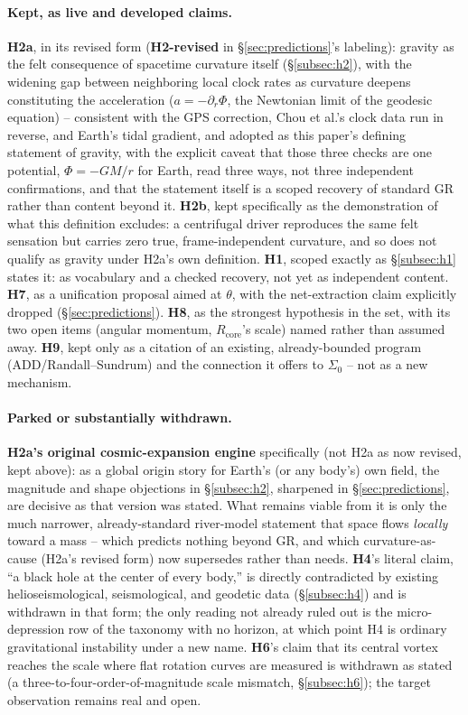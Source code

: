 \documentclass[12pt, a4paper]{article}
\begin{document}
\paragraph{Kept, as live and developed claims.}
\textbf{H2a}, in its revised form (\textbf{H2-revised} in
\S\ref{sec:predictions}'s labeling): gravity as the felt consequence
of spacetime curvature itself (\S\ref{subsec:h2}), with the widening
gap between neighboring local clock rates as curvature deepens
constituting the acceleration ($a=-\partial_r\Phi$, the Newtonian
limit of the geodesic equation) -- consistent with the GPS
correction, Chou et al.'s clock data run in reverse, and Earth's
tidal gradient, and adopted as this paper's defining statement of
gravity, with the explicit caveat that those three checks are one
potential, $\Phi=-GM/r$ for Earth, read three ways, not three
independent confirmations, and that the statement itself is a
scoped recovery of standard GR rather than content beyond it.
\textbf{H2b}, kept specifically as the
demonstration of what this definition excludes: a centrifugal driver
reproduces the same felt sensation but carries zero true,
frame-independent curvature, and so does not qualify as gravity under
H2a's own definition. \textbf{H1}, scoped exactly as \S\ref{subsec:h1}
states it: as vocabulary and a checked recovery, not yet as
independent content.
\textbf{H7}, as a unification proposal aimed at $\theta$, with the
net-extraction claim explicitly dropped
(\S\ref{sec:predictions}). \textbf{H8}, as the strongest hypothesis in
the set, with its two open items (angular momentum, $R_{\mathrm{core}}$'s
scale) named rather than assumed away. \textbf{H9}, kept only as a
citation of an existing, already-bounded program (ADD/Randall--Sundrum)
and the connection it offers to $\Sigma_0$ -- not as a new mechanism.

\paragraph{Parked or substantially withdrawn.}
\textbf{H2a's original cosmic-expansion engine} specifically (not H2a
as now revised, kept above): as a global origin story for Earth's (or
any body's) own field, the magnitude and shape objections in
\S\ref{subsec:h2}, sharpened in \S\ref{sec:predictions}, are decisive
as that version was stated. What remains viable from it is only the
much narrower, already-standard river-model statement that space
flows \emph{locally} toward a mass -- which predicts nothing beyond
GR, and which curvature-as-cause (H2a's revised form) now supersedes
rather than needs. \textbf{H4}'s literal claim, ``a black hole at the center of every
body,'' is directly contradicted by existing helioseismological,
seismological, and geodetic data (\S\ref{subsec:h4}) and is withdrawn
in that form; the only reading not already ruled out is the
micro-depression row of the taxonomy with no horizon, at which point
H4 is ordinary gravitational instability under a new name.
\textbf{H6}'s claim that its central vortex reaches the scale where
flat rotation curves are measured is withdrawn as stated (a
three-to-four-order-of-magnitude scale mismatch,
\S\ref{subsec:h6}); the target observation remains real and open.
\end{document}
